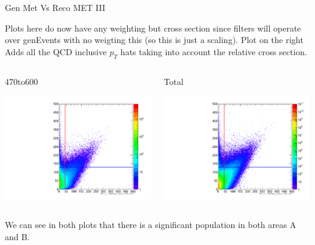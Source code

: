 \documentclass[8pt]{beamer}
\begin{document}
\begin{frame}{Gen Met Vs Reco MET III}

Plots here do now have any weighting but cross section since filters will operate over genEvents with no weigting this (so this is just a scaling).
Plot on the right Adds all the QCD inclusive $p_T$ hats taking into account the relative cross section.

\begin{columns}

\begin{block}{470to600}
 
\includegraphics[width=\linewidth]{img/MC_QCD-Pt-470to600-pythia6_GenVsReco_met}

\end{block}

\begin{block}{Total}
 
\includegraphics[width=\linewidth]{img/MC_QCDIncAll_GenVsReco_met}
 
\end{block}

\end{columns}

We can see in both plots that there is a significant population in both areas A and B.

\end{frame}
\end{document}
